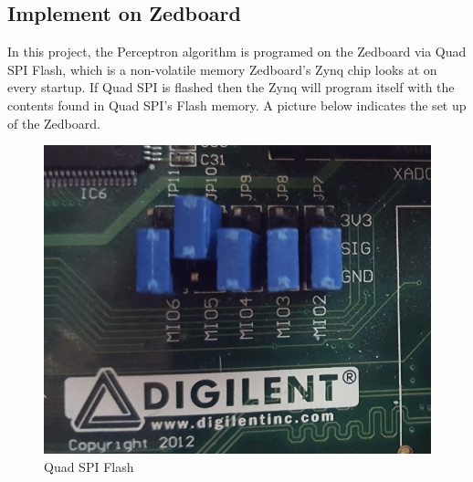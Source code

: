 \documentclass[12pt, a4paper, oneside]{article}
\begin{document}
    	\subsection{Implement on Zedboard}
    		In this project, the Perceptron algorithm is programed on the Zedboard via Quad SPI Flash, which is a non-volatile memory Zedboard's Zynq chip looks at on every startup. If Quad SPI is flashed then the Zynq will program itself with the contents found in Quad SPI's Flash memory. A picture below indicates the set up of the Zedboard.
    		
    		\begin{figure}[tbh!]
    			\begin{center}
    				\includegraphics[scale=0.6]{QSPI.png}
    				\caption{Quad SPI Flash}
    				\label{fig:Quad SPI Flash}
    			\end{center}
    		\end{figure}
    		
\end{document}
